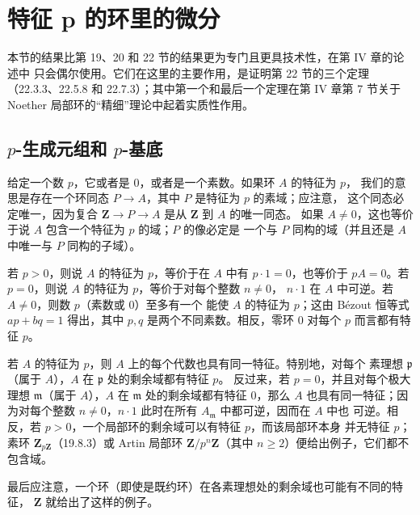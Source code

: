 \section{特征 p 的环里的微分}
本节的结果比第 19、20 和 22 节的结果更为专门且更具技术性，在第 IV 章的论述中
只会偶尔使用。它们在这里的主要作用，是证明第 22 节的三个定理
（22.3.3、22.5.8 和 22.7.3）；其中第一个和最后一个定理在第 IV 章第 7 节关于
Noether 局部环的“精细”理论中起着实质性作用。
\subsection{$p$-生成元组和 $p$-基底}
\label{0.21.1-fr}

\begin{env}[21.1.1]
\label{0.21.1.1-fr}
给定一个数 $p$，它或者是 $0$，或者是一个素数。如果环 $A$ 的特征为 $p$，
我们的意思是存在一个环同态 $P\to A$，其中 $P$ 是特征为 $p$ 的素域；应注意，
这个同态必定唯一，因为复合
$\mathbf Z\to P\to A$ 是从 $\mathbf Z$ 到 $A$ 的唯一同态。
如果 $A\neq0$，这也等价于说 $A$ 包含一个特征为 $p$ 的域；$P$ 的像必定是
一个与 $P$ 同构的域（并且还是 $A$ 中唯一与 $P$ 同构的子域）。
\end{env}

\begin{env}[21.1.2]
\label{0.21.1.2-fr}
若 $p>0$，则说 $A$ 的特征为 $p$，等价于在 $A$ 中有 $p\cdot1=0$，也等价于
$pA=0$。若 $p=0$，则说 $A$ 的特征为 $p$，等价于对每个整数 $n\neq0$，
$n\cdot1$ 在 $A$ 中可逆。若 $A\neq0$，则数 $p$（素数或 $0$）至多有一个
能使 $A$ 的特征为 $p$；这由 Bézout 恒等式 $ap+bq=1$ 得出，其中 $p,q$
是两个不同素数。相反，零环 $0$ 对每个 $p$ 而言都有特征 $p$。
\end{env}

\begin{env}[21.1.3]
\label{0.21.1.3-fr}
若 $A$ 的特征为 $p$，则 $A$ 上的每个代数也具有同一特征。特别地，对每个
素理想 $\mathfrak p$（属于 $A$），$A$ 在 $\mathfrak p$ 处的剩余域都有特征 $p$。
反过来，若 $p=0$，并且对每个极大理想 $\mathfrak m$（属于 $A$），$A$ 在
$\mathfrak m$ 处的剩余域都有特征 $0$，那么 $A$ 也具有同一特征；因为对每个整数
$n\neq0$，$n\cdot1$ 此时在所有 $A_{\mathfrak m}$ 中都可逆，因而在 $A$ 中也
可逆。相反，若 $p>0$，一个局部环的剩余域可以有特征 $p$，而该局部环本身
并无特征 $p$；素环 $\mathbf Z_{p\mathbf Z}$（19.8.3）或 Artin 局部环
$\mathbf Z/p^n\mathbf Z$（其中 $n\geq2$）便给出例子，它们都不包含域。

最后应注意，一个环（即使是既约环）在各素理想处的剩余域也可能有不同的特征，
$\mathbf Z$ 就给出了这样的例子。
\end{env}

